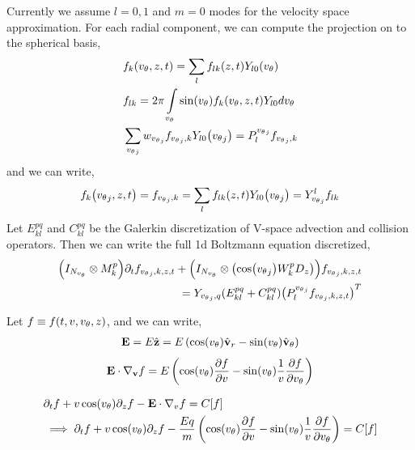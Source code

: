 \documentclass{article}[draft]
\begin{document}
Currently we assume $l=0, 1$ and $m=0$ modes for the velocity space approximation. For each radial component, we can compute the projection on to the spherical basis, 
\begin{align*}
&	f_k\of{\vtheta,z,t} = \sum_l f_{lk}\of{z, t} Y_{l0}\of{\vtheta}\\
&	f_{lk} = 2\pi \myint_{\vtheta} \sin\of{\vtheta} f_k\of{\vtheta, z, t} Y_{l0} d\vtheta \\
&\sum_{\vtheta_j} w_{\vtheta_j} f_{\vtheta_j,k} Y_{l0}\of{\vtheta_j} = P^{\vtheta_j}_l f_{\vtheta_j,k}
\end{align*} and we can write, 
\begin{align*}
	f_k\of{\vtheta_j, z, t} = f_{\vtheta_j,k} = \sum_l f_{lk}\of{z,t} Y_{l0}\of{\vtheta_j} = Y^{l}_{\vtheta_j} f_{lk}
\end{align*}
Let $E^{pq}_{kl}$ and $C^{pq}_{kl}$ be the Galerkin discretization of V-space advection and collision operators. Then we can write the full 1d Boltzmann equation discretized, 
\begin{align*}
\of{I_{N_\vtheta} \otimes M^{p}_{k}} \partial_t f_{\vtheta_j, k , z, t} + \of{I_{N_\vtheta} \otimes \of{\cos\of{\vtheta_j} W^{p}_k D_z}} f_{\vtheta_j, k , z, t} \\
= Y_{\vtheta_j, q} (E^{pq}_{kl} + C^{pq}_{kl}) \of{P^{\vtheta_j}_{l} f_{\vtheta_j,k,z,t}}^{T}
\end{align*}

Let $f\equiv f\of{t, v, \vtheta, z}$, and we can write, 
\begin{align*}
	\vect{E} 
	= E \hat{\vect{z}} 
	= E \left( \cos\of{\vtheta} \vrunit - \sin\of{\vtheta} \vthetaunit \right)
\end{align*}
\begin{align*}
	\vect{E}\cdot \nabla_{\vect{v}} f
	= E 
	\left( \cos\of{\vtheta} \frac{\partial f}{\partial \vr} 
	- \sin\of{\vtheta} \frac{1}{\vr} \frac{\partial f}{\partial \vtheta} \right)
\end{align*}

\begin{align*}
&\partial_t f + v\cos\of{\vtheta} \partial_z f -\vect{E}\cdot\nabla_v f = C[f] \\
&\implies \partial_t f + v\cos\of{\vtheta} \partial_z f -\frac{Eq}{m} 
\left( \cos\of{\vtheta} \frac{\partial f}{\partial \vr} 
- \sin\of{\vtheta} \frac{1}{\vr} \frac{\partial f}{\partial \vtheta} \right) = C[f] 
\end{align*}
\end{document}
